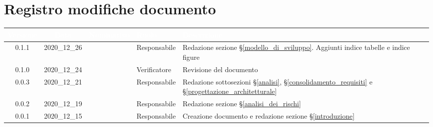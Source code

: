 \section*{Registro modifiche documento}
{

     
\renewcommand{\arraystretch}{1.5}
\centering
\begin{longtable}{ c c  C{2.3cm} C{3cm} C{3.2cm}}


 \textcolor{white}{\textbf{Versione}}&
    \textcolor{white}{\textbf{Data}}&
    \textcolor{white}{\textbf{Nominativo}}&
    \textcolor{white}{\textbf{Ruolo}}&
    \textcolor{white}{\textbf{Descrizione}}\\	
    \endhead

    0.1.1 & 2020\_12\_26 & \MM{} & Responsabile & Redazione sezione \S\ref{modello_di_sviluppo}. Aggiunti indice tabelle e indice figure \\

    0.1.0 & 2020\_12\_24 & \PC{} & Verificatore & Revisione del documento\\

    0.0.3 & 2020\_12\_21 & \MM{} & Responsabile & Redazione sottosezioni \S\ref{analisi}, \S\ref{consolidamento_requisiti} e \S\ref{progettazione_architetturale} \\

    0.0.2 & 2020\_12\_19 & \MM{} & Responsabile & Redazione sezione \S\ref{analisi_dei_rischi}\\

    0.0.1 & 2020\_12\_15 & \MM{} & Responsabile & Creazione documento e redazione sezione \S\ref{introduzione}
			
\end{longtable}
}